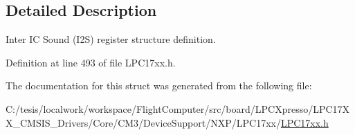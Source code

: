 \subsection{\-Detailed \-Description}
\-Inter \-I\-C \-Sound (\-I2\-S) register structure definition. 

\-Definition at line 493 of file \-L\-P\-C17xx.\-h.



\-The documentation for this struct was generated from the following file\-:\begin{DoxyCompactItemize}
\item 
\-C\-:/tesis/localwork/workspace/\-Flight\-Computer/src/board/\-L\-P\-C\-Xpresso/\-L\-P\-C17\-X\-X\-\_\-\-C\-M\-S\-I\-S\-\_\-\-Drivers/\-Core/\-C\-M3/\-Device\-Support/\-N\-X\-P/\-L\-P\-C17xx/\hyperlink{_l_p_c17xx_8h}{\-L\-P\-C17xx.\-h}\end{DoxyCompactItemize}
